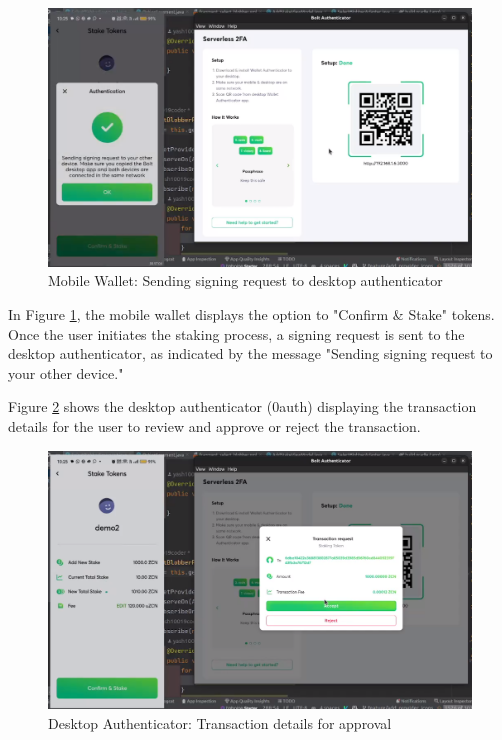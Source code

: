 \begin{figure}[h]
    \centering
    \includegraphics[width=\textwidth]{Images/transaction_initiation}
    \caption{Mobile Wallet: Sending signing request to desktop authenticator}
    \label{fig:transaction_screen1}
\end{figure}

In Figure \ref{fig:transaction_screen1}, the mobile wallet displays the option to "Confirm & Stake" tokens. Once the user initiates the staking process, a signing request is sent to the desktop authenticator, as indicated by the message "Sending signing request to your other device."

Figure \ref{fig:transaction_screen2} shows the desktop authenticator (0auth) displaying the transaction details for the user to review and approve or reject the transaction.

\begin{figure}[h]
    \centering
    \includegraphics[width=\textwidth]{Images/transaction_confirmation}
    \caption{Desktop Authenticator: Transaction details for approval}
    \label{fig:transaction_screen2}
\end{figure}

